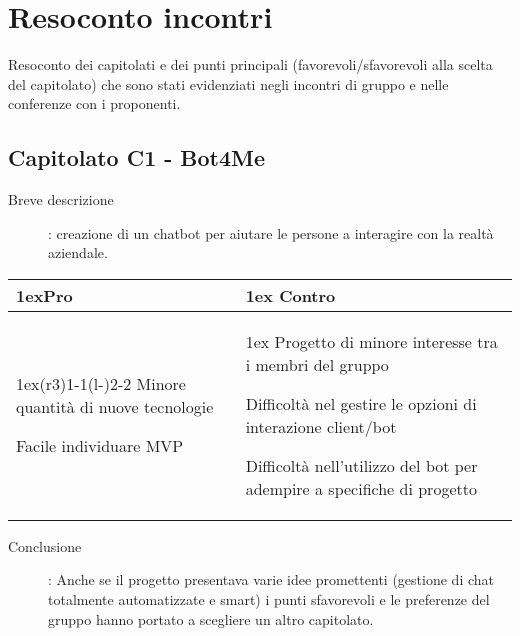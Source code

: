 \section{Resoconto incontri}
Resoconto dei capitolati e dei punti principali (favorevoli/sfavorevoli alla scelta del capitolato) che sono stati evidenziati negli incontri di gruppo e nelle conferenze con i proponenti.

\subsection{Capitolato C1 - Bot4Me}
\begin{description}
	\item [Breve descrizione]: creazione di un chatbot per aiutare le persone a interagire con la realtà aziendale.
\end{description}
\begin{table}[h]
\begin{tabularx}{\linewidth}{>{\parskip1ex}X@{\kern4\tabcolsep}>{\parskip1ex}X}
\hfil\bfseries Pro
&
\hfil\bfseries Contro
\\\cmidrule(r{3\tabcolsep}){1-1}\cmidrule(l{-\tabcolsep}){2-2}
Minore quantità di nuove tecnologie \par
Facile individuare MVP
&
Progetto di minore interesse tra i membri del gruppo \par
Difficoltà nel gestire le opzioni di interazione client/bot \par
Difficoltà nell'utilizzo del bot per adempire a specifiche di progetto
\end{tabularx}
\end{table}
\begin{description}
	\item [Conclusione]: Anche se il progetto presentava varie idee promettenti (gestione di chat totalmente automatizzate e smart) i punti sfavorevoli e le preferenze del gruppo hanno portato a scegliere un altro capitolato.
\end{description}

\vspace{1cm}

